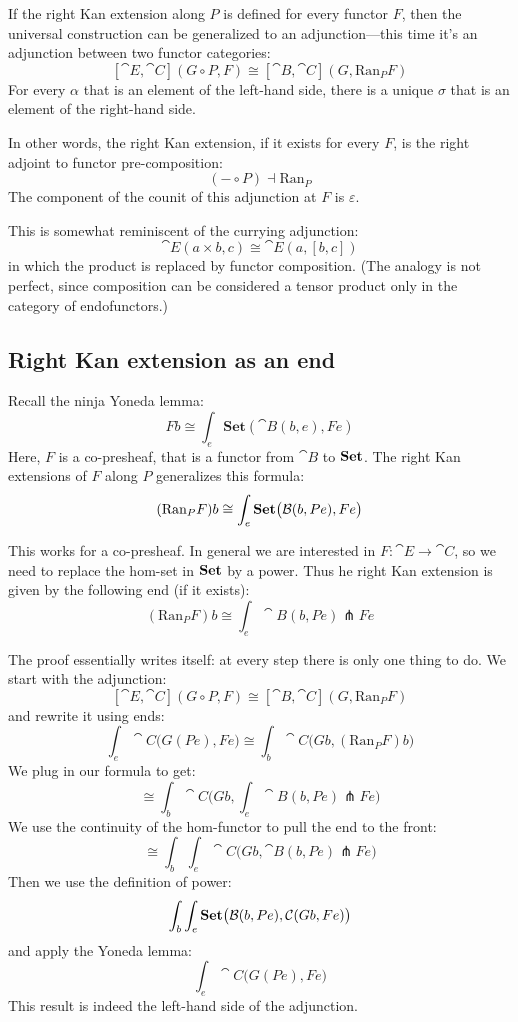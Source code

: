 \documentclass[DaoFP]{subfiles}
\begin{document}
If the right Kan extension along $P$ is defined for every functor $F$, then the universal construction can be generalized to an adjunction---this time it's an adjunction between two functor categories:
\[ [\cat E, \cat C](G \circ P, F) \cong [\cat B, \cat C](G, \text{Ran}_P F) \]
For every $\alpha$ that is an element of the left-hand side, there is a unique $\sigma$ that is an element of the right-hand side.

In other words, the right Kan extension, if it exists for every $F$, is the right adjoint to functor pre-composition:
\[ (- \circ P) \dashv \text{Ran}_P \]
The component of the counit of this adjunction at $F$ is $\varepsilon$.

This is somewhat reminiscent of the currying adjunction:
\[ \cat E (a \times b, c) \cong \cat E (a, [b, c]) \]
in which the product is replaced by functor composition. (The analogy is not perfect, since composition can be considered a tensor product only in the category of endofunctors.)

\subsection{Right Kan extension as an end}

Recall the ninja Yoneda lemma:
\[ F b \cong \int_{e} \mathbf{Set} (\cat B(b, e), F e) \]
Here, $F$ is a co-presheaf, that is a functor from $\cat B$ to $\mathbf{Set}$. The right Kan extensions of $F$ along $P$ generalizes this formula:
\[ (\text{Ran}_P F) b \cong \int_e \mathbf{Set} \big( \mathcal{B} (b, P e), F e\big) \]

This works for a co-presheaf. In general we are interested in $F \colon \cat E \to \cat C$, so we need to replace the hom-set in $\mathbf{Set}$ by a power. Thus he right Kan extension is given by the following end (if it exists):
 \[ (\text{Ran}_P F) b \cong \int_e \cat B (b, P e) \pitchfork F e \]
 
 The proof essentially writes itself: at every step there is only one thing to do. We start with the adjunction:
  \[ [\cat E, \cat C](G \circ P, F) \cong [\cat B, \cat C](G, \text{Ran}_P F) \]
and rewrite it using ends:
 \[ \int_e \cat C \big(G ( P e), F e\big) \cong \int_b \cat C\big(G b, (\text{Ran}_P F) b\big) \]
We plug in our formula to get:
 \[ \cong  \int_b \cat C\big(G b,\int_e \cat B (b, P e) \pitchfork F e \big)\]
We use the continuity of the hom-functor to pull the end to the front:
\[  \cong  \int_b \int_e \cat C\big(G b, \cat B (b, P e) \pitchfork F e \big) \]
Then we use the definition of power:
\[ \int_b \int_e \mathbf{Set} \big(  \mathcal{B} (b, P e), \mathcal{C} (G b, F e) \big) \]
and apply the Yoneda lemma:
\[ \int_e  \cat C \big(G (P e), F e\big) \]
This result is indeed the left-hand side of the adjunction.
 
\end{document}
